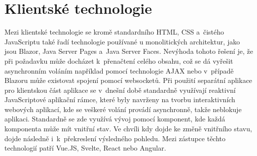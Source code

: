 \section{Klientské technologie}
Mezi klientské technologie se kromě standardního HTML, CSS a~čistého JavaScriptu také řadí technologie používané u monolitických architektur, jako jsou Blazor, Java Server Pages a~Java Server Faces. Nevýhoda tohoto řešení je, že při požadavku může docházet k~přenačtení celého obsahu, což se dá vyřešit asynchronním voláním například pomocí technologie AJAX nebo v~případě Blazoru může existovat spojení pomocí websocketů.
\newpara
Při použití separátní aplikace pro klientskou část aplikace se v~dnešní době standardně využívají reaktivní JavaScriptové aplikační rámce, které byly navrženy na tvorbu interaktivních webových aplikací, kde se veškeré volání provádí asynchronně, takže neblokuje aplikaci. Standardně se zde využívá vývoj pomocí komponent, kde každá komponenta může mít vnitřní stav. Ve chvíli kdy dojde ke změně vnitřního stavu, dojde následně i~k~překreslení výsledného pohledu. Mezi zástupce těchto technologií patří Vue.JS, Svelte, React nebo Angular. 
